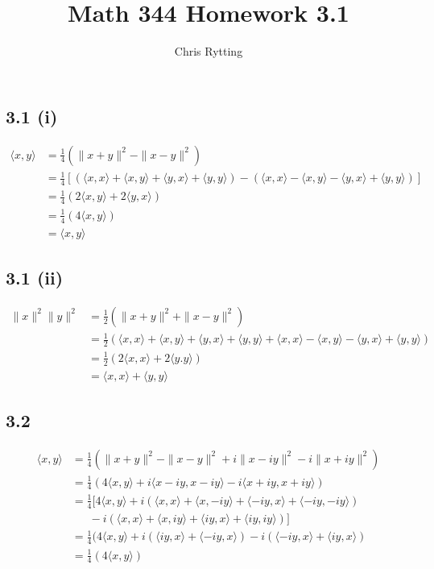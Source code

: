 \documentclass[letterpaper,12pt]{article}
\title{Math 344 Homework 3.1}
\author{Chris Rytting}
\theoremstyle{definition}
\begin{document}
\maketitle

\subsection*{3.1 (i)}
\begin{align*}
\langle x,y\rangle  &= \frac{1}{4}(\|x+y\|^{2} - \|x-y\|^{2}) \\
&= \frac{1}{4}[(\langle x,x\rangle  + \langle x,y\rangle  + \langle y,x\rangle  + \langle y,y\rangle ) - (\langle x,x\rangle  - \langle x,y\rangle  - \langle y,x\rangle  + \langle y,y\rangle )] \\
&= \frac{1}{4}(2\langle x,y\rangle  + 2\langle y,x\rangle ) \\
&= \frac{1}{4}(4\langle x,y\rangle ) \\
&= \langle x,y\rangle 
\end{align*}
\subsection*{3.1 (ii)}
\begin{align*}
\|x\|^{2}\|y\|^{2} &= \frac{1}{2}(\|x+y\|^{2} + \|x-y\|^{2}) \\
&= \frac{1}{2}(\langle x,x\rangle  + \langle x,y\rangle  + \langle y,x\rangle  + \langle y,y\rangle + \langle x,x\rangle  - \langle x,y\rangle  - \langle y,x\rangle  + \langle y,y\rangle ) \\
&= \frac{1}{2}(2\langle x,x\rangle  + 2\langle y.y\rangle ) \\
&= \langle x,x\rangle  + \langle y,y\rangle 
\end{align*}

\subsection*{3.2}
\begin{align*}
\langle x,y\rangle  &= \frac{1}{4}(\|x+y\|^{2} - \|x-y\|^{2} + i\|x-iy\|^{2} - i\|x+iy\|^{2}) \\
&= \frac{1}{4}(4\langle x,y\rangle  + i\langle x-iy,x-iy\rangle  - i\langle x+iy,x+iy\rangle ) \\
&= \frac{1}{4}[4\langle x,y\rangle  + i(\langle x,x\rangle  + \langle x,-iy\rangle  + \langle -iy,x\rangle  + \langle -iy,-iy\rangle ) \\
&~~~~~~~ - i(\langle x,x\rangle  + \langle x,iy\rangle  + \langle iy,x\rangle  + \langle iy,iy\rangle )] \\
&= \frac{1}{4}(4\langle x,y\rangle  + i(\langle iy,x\rangle  + \langle -iy,x\rangle ) - i(\langle -iy,x\rangle  + \langle iy,x\rangle ) \\
&= \frac{1}{4}(4\langle x,y\rangle )
\end{align*}
\end{document}
